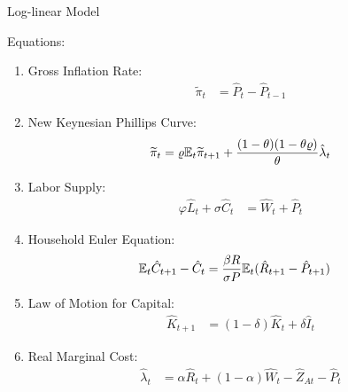 \documentclass[../quali_slides.tex]{subfiles}
\begin{document}
\begin{frame}[allowframebreaks]{Log-linear Model}
	
	Equations:	
	
	\begin{enumerate}
		
		\item Gross Inflation Rate:
		\begin{align}
			\widetilde{\pi}_t &= \hat{P}_t - \hat{P}_{t-1}
		\end{align}
		
		\item New Keynesian Phillips Curve:
		\begin{align}
			\widetilde{\pi}_t = \varrho {\mathbb{E}_{t}} \widetilde{\pi}_{t+1} + \frac{(1-\theta) (1- \theta \varrho)}{\theta} \hat{\lambda}_t
		\end{align}
		
		\item Labor Supply:
		\begin{align}
			\varphi \hat{L}_t + \sigma \hat{C}_t &= \hat{W}_t + \hat{P}_t
		\end{align}
		
		\item Household Euler Equation:
		\begin{align}
			{\mathbb{E}_{t}} \hat{C}_{t+1} - \hat{C}_t &= \frac{\beta R}{\sigma P} {\mathbb{E}_{t}}(\hat{R}_{t+1} - \hat{P}_{t+1})
		\end{align}
		
		\item Law of Motion for Capital:
		\begin{align}
			\hat{K}_{t+1} &= (1-\delta)\hat{K}_t + \delta \hat{I}_t
		\end{align}
		
		
		\item Real Marginal Cost:
		\begin{align}
			\hat{\lambda}_t &= \alpha \hat{R}_t + (1- \alpha) \hat{W}_t - \hat{Z}_{At} - \hat{P}_t %
		\end{align}
		

\end{enumerate}
\end{frame}
\end{document}
